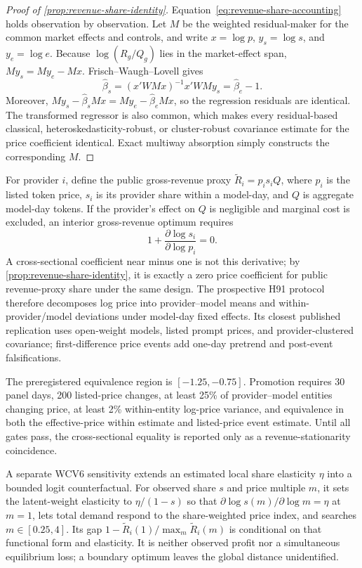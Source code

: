 \documentclass[11pt]{article}
\newcommand{\1}{\mathbf{1}}
\begin{document}
\begin{proof}[Proof of \cref{prop:revenue-share-identity}]
Equation~\eqref{eq:revenue-share-accounting} holds observation by observation.
Let $M$ be the weighted residual-maker for the common market effects and controls,
and write $x=\log p$, $y_s=\log s$, and $y_e=\log e$.  Because
$\log(R_g/Q_g)$ lies in the market-effect span,
$My_s=My_e-Mx$.  Frisch--Waugh--Lovell gives
\[
 \widehat\beta_s=(x'WMx)^{-1}x'WMy_s
 =\widehat\beta_e-1.
\]
Moreover,
$My_s-\widehat\beta_sMx=My_e-\widehat\beta_eMx$, so the regression residuals
are identical.  The transformed regressor is also common, which makes every
residual-based classical, heteroskedasticity-robust, or cluster-robust covariance
estimate for the price coefficient identical.  Exact multiway absorption simply
constructs the corresponding $M$.
\end{proof}

For provider $i$, define the public gross-revenue proxy
$\widetilde R_i=p_i s_iQ$, where $p_i$ is the listed token price, $s_i$ is its
provider share within a model-day, and $Q$ is aggregate model-day tokens.  If the
provider's effect on $Q$ is negligible and marginal cost is excluded, an interior
gross-revenue optimum requires
\begin{equation}
  1+\frac{\partial\log s_i}{\partial\log p_i}=0.
  \label{eq:revenue-foc}
\end{equation}
A cross-sectional coefficient near minus one is not this derivative; by
\cref{prop:revenue-share-identity}, it is exactly a zero price coefficient for
public revenue-proxy share under the same design.  The prospective H91 protocol
therefore decomposes log price into provider--model means
and within-provider/model deviations under model-day fixed effects.  Its closest
published replication uses open-weight models, listed prompt prices, and
provider-clustered covariance; first-difference price events add one-day pretrend
and post-event falsifications.

The preregistered equivalence region is $[-1.25,-0.75]$.  Promotion requires 30
panel days, 200 listed-price changes, at least 25\% of provider--model entities
changing price, at least 2\% within-entity log-price variance, and equivalence in
both the effective-price within estimate and listed-price event estimate.  Until
all gates pass, the cross-sectional equality is reported only as a
revenue-stationarity coincidence.

A separate WCV6 sensitivity extends an estimated local share elasticity $\eta$
into a bounded logit counterfactual.  For observed share $s$ and price multiple
$m$, it sets the latent-weight elasticity to $\eta/(1-s)$ so that
$\partial\log s(m)/\partial\log m=\eta$ at $m=1$, lets total demand respond to the
share-weighted price index, and searches $m\in[0.25,4]$.  Its gap
$1-\widetilde R_i(1)/\max_m\widetilde R_i(m)$ is conditional on that functional
form and elasticity.  It is neither observed profit nor a simultaneous
equilibrium loss; a boundary optimum leaves the global distance unidentified.
\end{document}
